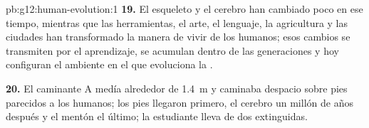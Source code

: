 \begin{solution}{pb:g12:human-evolution:1}
\textbf{19.} El esqueleto y el cerebro han cambiado poco en ese tiempo,
mientras que las herramientas, el arte, el lenguaje, la agricultura y
las ciudades han transformado la manera de vivir de los humanos; esos
cambios se transmiten por el aprendizaje, se acumulan dentro de las
generaciones y hoy configuran el ambiente en el que evoluciona la
.

\textbf{20.} El caminante A medía alrededor de \qty{1.4}{m} y caminaba
despacio sobre pies parecidos a los humanos; los pies llegaron primero,
el cerebro un millón de años después y el mentón el último; la
estudiante lleva  de dos  extinguidas.
\end{solution}
